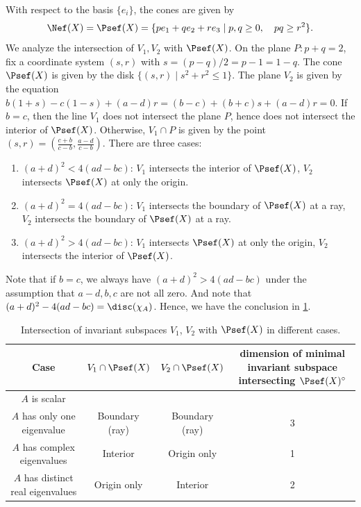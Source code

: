     With respect to the basis \(\{e_i\}\), the cones are given by
    \[ \Nef(X) = \Psef(X) = \{p e_1 + q e_2 + r e_3 \mid p,q \geq 0, \quad pq \geq r^2\}. \]
    We analyze the intersection of \(V_1, V_2\) with \(\Psef(X)\).
    On the plane \(P: p+q = 2\), fix a coordinate system \((s,r)\) with \(s = (p-q)/2 = p-1 = 1-q\).
    The cone \(\Psef(X)\) is given by the disk \(\{ (s,r) \mid s^2 + r^2 \leq 1\}\).
    The plane \(V_2\) is given by the equation \(b(1+s) - c(1-s) + (a-d)r = (b-c) + (b+c)s + (a-d)r = 0\).
    If \(b=c\), then the line \(V_1\) does not intersect the plane \(P\), hence does not intersect the interior of \(\Psef(X)\).
    Otherwise, \(V_1 \cap P\) is given by the point \((s,r) = \left(\frac{c+b}{c-b}, \frac{a-d}{c-b}\right)\).
    There are three cases:
    \begin{enumerate}
        \item \((a+d)^2 < 4(ad-bc)\): \(V_1\) intersects the interior of \(\Psef(X)\), \(V_2\) intersects \(\Psef(X)\) at only the origin.
        \item \((a+d)^2 = 4(ad-bc)\): \(V_1\) intersects the boundary of \(\Psef(X)\) at a ray, \(V_2\) intersects the boundary of \(\Psef(X)\) at a ray.
        \item \((a+d)^2 > 4(ad-bc)\): \(V_1\) intersects \(\Psef(X)\) at only the origin, \(V_2\) intersects the interior of \(\Psef(X)\).
    \end{enumerate}
    Note that if \(b=c\), we always have \((a+d)^2 > 4(ad-bc)\) under the assumption that \(a-d,b,c\) are not all zero.
    And note that \((a+d)^2 - 4(ad-bc) = \disc(\chi_A)\).
    Hence, we have the conclusion in \cref{table:intersection_of_invariant_subspaces_with_psef_cone_on_product_of_elliptic_curves}.
    \begin{table}[!ht]
        \centering
        \begin{tabular}{|c|c|c|c|}
            \hline
            Case & $V_1 \cap \Psef(X)$ & $V_2 \cap \Psef(X)$ & \makecell[c]{dimension of minimal \\ invariant subspace \\ intersecting \(\Psef(X)^\circ\)} \\
            \hline
            \(A\) is scalar &  &  &  \\
            \(A\) has only one eigenvalue  & Boundary (ray) & Boundary (ray) & 3 \\
            \(A\) has complex eigenvalues & Interior & Origin only & 1 \\
            \(A\) has distinct real eigenvalues & Origin only & Interior & 2 \\
            \hline
        \end{tabular}
        \caption{Intersection of invariant subspaces $V_1$, $V_2$ with $\Psef(X)$ in different cases.}
        \label{table:intersection_of_invariant_subspaces_with_psef_cone_on_product_of_elliptic_curves}
    \end{table}
        
